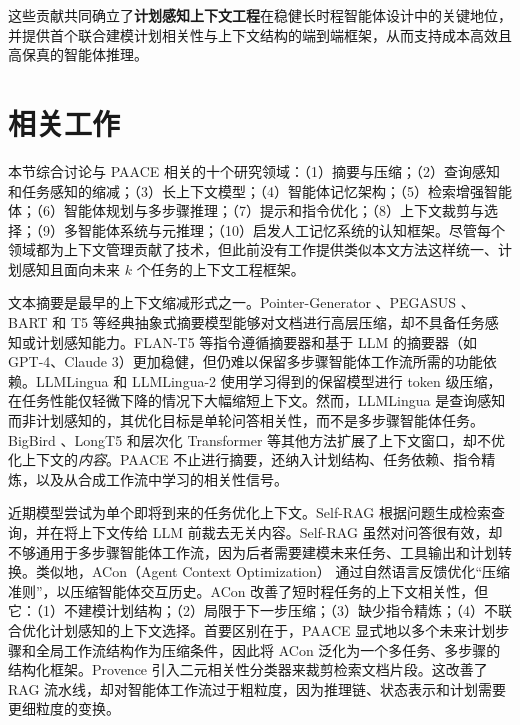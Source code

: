 \documentclass[10pt,twocolumn]{article}
\begin{document}
这些贡献共同确立了\textbf{计划感知上下文工程}在稳健长时程智能体设计中的关键地位，并提供首个联合建模计划相关性与上下文结构的端到端框架，从而支持成本高效且高保真的智能体推理。

\section{相关工作}
\label{sec:related}

本节综合讨论与 PAACE 相关的十个研究领域：（1）摘要与压缩；（2）查询感知和任务感知的缩减；（3）长上下文模型；（4）智能体记忆架构；（5）检索增强智能体；（6）智能体规划与多步骤推理；（7）提示和指令优化；（8）上下文裁剪与选择；（9）多智能体系统与元推理；（10）启发人工记忆系统的认知框架。尽管每个领域都为上下文管理贡献了技术，但此前没有工作提供类似本文方法这样统一、计划感知且面向未来 $k$ 个任务的上下文工程框架。

文本摘要是最早的上下文缩减形式之一。Pointer-Generator \citep{see2017pg}、PEGASUS \citep{zhang2019pegasus}、BART \citep{lewis2019bart} 和 T5 \citep{raffel2020t5} 等经典抽象式摘要模型能够对文档进行高层压缩，却不具备任务感知或计划感知能力。FLAN-T5 \citep{chung2022flan} 等指令遵循摘要器和基于 LLM 的摘要器（如 GPT-4、Claude 3）更加稳健，但仍难以保留多步骤智能体工作流所需的功能依赖。LLMLingua \citep{jiang2023llmlingua} 和 LLMLingua-2 \citep{jiang2024llmlingua2} 使用学习得到的保留模型进行 token 级压缩，在任务性能仅轻微下降的情况下大幅缩短上下文。然而，LLMLingua 是查询感知而非计划感知的，其优化目标是单轮问答相关性，而不是多步骤智能体任务。BigBird \citep{zaheer2020bigbird}、LongT5 \citep{guo2021longt5} 和层次化 Transformer 等其他方法扩展了上下文窗口，却不优化上下文的\emph{内容}。PAACE 不止进行摘要，还纳入计划结构、任务依赖、指令精炼，以及从合成工作流中学习的相关性信号。

近期模型尝试为单个即将到来的任务优化上下文。Self-RAG \citep{asai2024selfrag} 根据问题生成检索查询，并在将上下文传给 LLM 前裁去无关内容。Self-RAG 虽然对问答很有效，却不够通用于多步骤智能体工作流，因为后者需要建模未来任务、工具输出和计划转换。类似地，ACon（Agent Context Optimization）\citep{acon2025yu} 通过自然语言反馈优化“压缩准则”，以压缩智能体交互历史。ACon 改善了短时程任务的上下文相关性，但它：（1）不建模计划结构；（2）局限于下一步压缩；（3）缺少指令精炼；（4）不联合优化计划感知的上下文选择。首要区别在于，PAACE 显式地以多个未来计划步骤和全局工作流结构作为压缩条件，因此将 ACon 泛化为一个多任务、多步骤的结构化框架。Provence \citep{wu2024provence} 引入二元相关性分类器来裁剪检索文档片段。这改善了 RAG 流水线，却对智能体工作流过于粗粒度，因为推理链、状态表示和计划需要更细粒度的变换。
\end{document}
